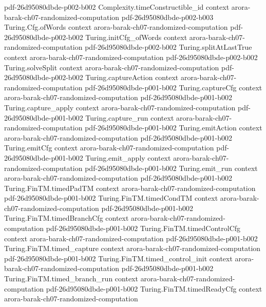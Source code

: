 \begin{theorem}
  {pdf-26d95080dbde-p002-b002}
\proofstep
  {Complexity.timeConstructible_id}
  {context}
  {arora-barak-ch07-randomized-computation}
  {pdf-26d95080dbde-p002-b003}
\proofstep
  {Turing.Cfg.ofWords}
  {context}
  {arora-barak-ch07-randomized-computation}
  {pdf-26d95080dbde-p002-b002}
\proofstep
  {Turing.initCfg_ofWords}
  {context}
  {arora-barak-ch07-randomized-computation}
  {pdf-26d95080dbde-p002-b002}
\proofstep
  {Turing.splitAtLastTrue}
  {context}
  {arora-barak-ch07-randomized-computation}
  {pdf-26d95080dbde-p002-b002}
\proofstep
  {Turing.solveSplit}
  {context}
  {arora-barak-ch07-randomized-computation}
  {pdf-26d95080dbde-p002-b002}
\proofstep
  {Turing.captureAction}
  {context}
  {arora-barak-ch07-randomized-computation}
  {pdf-26d95080dbde-p001-b002}
\proofstep
  {Turing.captureCfg}
  {context}
  {arora-barak-ch07-randomized-computation}
  {pdf-26d95080dbde-p001-b002}
\proofstep
  {Turing.capture_apply}
  {context}
  {arora-barak-ch07-randomized-computation}
  {pdf-26d95080dbde-p001-b002}
\proofstep
  {Turing.capture_run}
  {context}
  {arora-barak-ch07-randomized-computation}
  {pdf-26d95080dbde-p001-b002}
\proofstep
  {Turing.emitAction}
  {context}
  {arora-barak-ch07-randomized-computation}
  {pdf-26d95080dbde-p001-b002}
\proofstep
  {Turing.emitCfg}
  {context}
  {arora-barak-ch07-randomized-computation}
  {pdf-26d95080dbde-p001-b002}
\proofstep
  {Turing.emit_apply}
  {context}
  {arora-barak-ch07-randomized-computation}
  {pdf-26d95080dbde-p001-b002}
\proofstep
  {Turing.emit_run}
  {context}
  {arora-barak-ch07-randomized-computation}
  {pdf-26d95080dbde-p001-b002}
\proofstep
  {Turing.FinTM.timedPadTM}
  {context}
  {arora-barak-ch07-randomized-computation}
  {pdf-26d95080dbde-p001-b002}
\proofstep
  {Turing.FinTM.timedCondTM}
  {context}
  {arora-barak-ch07-randomized-computation}
  {pdf-26d95080dbde-p001-b002}
\proofstep
  {Turing.FinTM.timedBranchCfg}
  {context}
  {arora-barak-ch07-randomized-computation}
  {pdf-26d95080dbde-p001-b002}
\proofstep
  {Turing.FinTM.timedControlCfg}
  {context}
  {arora-barak-ch07-randomized-computation}
  {pdf-26d95080dbde-p001-b002}
\proofstep
  {Turing.FinTM.timed_capture}
  {context}
  {arora-barak-ch07-randomized-computation}
  {pdf-26d95080dbde-p001-b002}
\proofstep
  {Turing.FinTM.timed_control_init}
  {context}
  {arora-barak-ch07-randomized-computation}
  {pdf-26d95080dbde-p001-b002}
\proofstep
  {Turing.FinTM.timed_branch_run}
  {context}
  {arora-barak-ch07-randomized-computation}
  {pdf-26d95080dbde-p001-b002}
\proofstep
  {Turing.FinTM.timedReadyCfg}
  {context}
  {arora-barak-ch07-randomized-computation}

\end{theorem}
